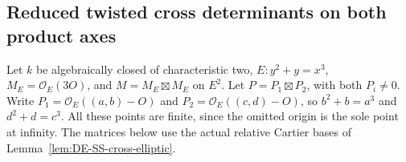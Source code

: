 \subsection{Reduced twisted cross determinants on both product axes}

Let \(k\) be algebraically closed of characteristic two,
\(E:y^2+y=x^3\), \(M_E=\mathcal O_E(3O)\), and
\(M=M_E\boxtimes M_E\) on \(E^2\).
Let \(P=P_1\boxtimes P_2\), with both \(P_i\ne0\).
Write \(P_1=\mathcal O_E((a,b)-O)\) and
\(P_2=\mathcal O_E((c,d)-O)\), so
\(b^2+b=a^3\) and \(d^2+d=c^3\).
All these points are finite, since the omitted origin is the sole
point at infinity. The matrices below use the actual relative
Cartier bases of Lemma~\ref{lem:DE-SS-cross-elliptic}.

